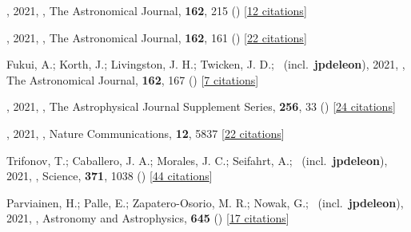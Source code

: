 \item[{\color{numcolor}\scriptsize43}] , 2021, , The Astronomical Journal, \textbf{162}, 215 () [\href{https://ui.adsabs.harvard.edu/abs/2021AJ....162..215S}{12 citations}]

\item[{\color{numcolor}\scriptsize42}] , 2021, , The Astronomical Journal, \textbf{162}, 161 () [\href{https://ui.adsabs.harvard.edu/abs/2021AJ....162..161H}{22 citations}]

\item[{\color{numcolor}\scriptsize41}] Fukui, A.; Korth, J.; Livingston, J. H.; Twicken, J. D.; \etal\ (incl.\ \textbf{jpdeleon}), 2021, , The Astronomical Journal, \textbf{162}, 167 () [\href{https://ui.adsabs.harvard.edu/abs/2021AJ....162..167F}{7 citations}]

\item[{\color{numcolor}\scriptsize40}] , 2021, , The Astrophysical Journal Supplement Series, \textbf{256}, 33 () [\href{https://ui.adsabs.harvard.edu/abs/2021ApJS..256...33T}{24 citations}]

\item[{\color{numcolor}\scriptsize39}] , 2021, , Nature Communications, \textbf{12}, 5837 [\href{https://ui.adsabs.harvard.edu/abs/2021NatCo..12.5837T}{22 citations}]

\item[{\color{numcolor}\scriptsize38}] Trifonov, T.; Caballero, J. A.; Morales, J. C.; Seifahrt, A.; \etal\ (incl.\ \textbf{jpdeleon}), 2021, , Science, \textbf{371}, 1038 () [\href{https://ui.adsabs.harvard.edu/abs/2021Sci...371.1038T}{44 citations}]

\item[{\color{numcolor}\scriptsize37}] Parviainen, H.; Palle, E.; Zapatero-Osorio, M. R.; Nowak, G.; \etal\ (incl.\ \textbf{jpdeleon}), 2021, , Astronomy and Astrophysics, \textbf{645} () [\href{https://ui.adsabs.harvard.edu/abs/2021A&A...645A..16P}{17 citations}]

